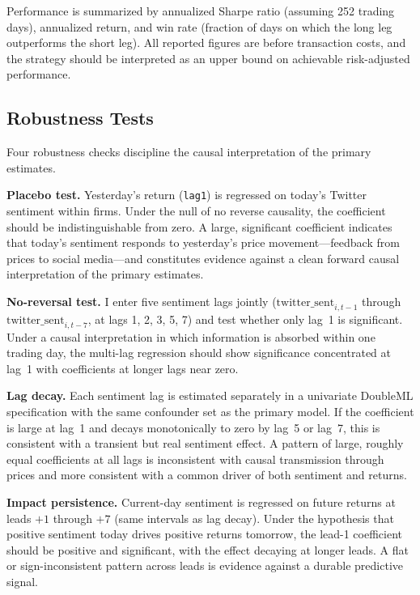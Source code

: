 Performance is summarized by annualized Sharpe ratio (assuming 252
trading days), annualized return, and win rate (fraction of days on
which the long leg outperforms the short leg). All reported figures are
before transaction costs, and the strategy should be interpreted as an
upper bound on achievable risk-adjusted performance.

\subsection{Robustness Tests}\label{robustness-tests}

Four robustness checks discipline the causal interpretation of the
primary estimates.

\textbf{Placebo test.} Yesterday's return (\texttt{lag1}) is regressed
on today's Twitter sentiment within firms. Under the null of no reverse
causality, the coefficient should be indistinguishable from zero. A
large, significant coefficient indicates that today's sentiment responds
to yesterday's price movement---feedback from prices to social media---and
constitutes evidence against a clean forward causal interpretation of the
primary estimates.

\textbf{No-reversal test.} I enter five sentiment lags jointly
(\(\text{twitter\_sent}_{i,t - 1}\) through
\(\text{twitter\_sent}_{i,t - 7}\), at lags 1, 2, 3, 5, 7) and test
whether only lag~1 is significant. Under a causal interpretation in
which information is absorbed within one trading day, the multi-lag
regression should show significance concentrated at lag~1 with
coefficients at longer lags near zero.

\textbf{Lag decay.} Each sentiment lag is estimated separately in a
univariate DoubleML specification with the same confounder set as the
primary model. If the coefficient is large at lag~1 and decays
monotonically to zero by lag~5 or lag~7, this is consistent with a
transient but real sentiment effect. A pattern of large, roughly equal
coefficients at all lags is inconsistent with causal transmission
through prices and more consistent with a common driver of both
sentiment and returns.

\textbf{Impact persistence.} Current-day sentiment is regressed on
future returns at leads \(+ 1\) through \(+ 7\) (same intervals as lag
decay). Under the hypothesis that positive sentiment today drives
positive returns tomorrow, the lead-1 coefficient should be positive and
significant, with the effect decaying at longer leads. A flat or
sign-inconsistent pattern across leads is evidence against a durable
predictive signal.

